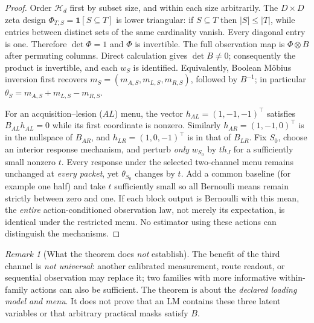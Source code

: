 \documentclass[11pt,a4paper]{article}
\newcommand{\Hh}{\mathcal{H}}\newcommand{\V}{\mathcal{V}}
\newcommand{\ind}{\mathbf{1}}\newcommand{\supp}{\mathrm{supp}}
\theoremstyle{definition}\newtheorem{definition}[theorem]{Definition}
\theoremstyle{remark}\newtheorem{remark}[theorem]{Remark}
\begin{document}
\begin{proof}
Order $\Hh_d$ first by subset size, and within each size arbitrarily. The $D\times D$ zeta design $\Phi_{T,S}=\ind[S\subseteq T]$ is lower triangular: if $S\subseteq T$ then $|S|\le |T|$, while entries between distinct sets of the same cardinality vanish. Every diagonal entry is one. Therefore $\det\Phi=1$ and $\Phi$ is invertible. The full observation map is $\Phi\otimes B$ after permuting columns. Direct calculation gives $\det B\ne 0$; consequently the product is invertible, and each $w_S$ is identified. Equivalently, Boolean M\"obius inversion first recovers $m_S=(m_{A,S},m_{L,S},m_{R,S})$, followed by $B^{-1}$; in particular $\theta_S=m_{A,S}+m_{L,S}-m_{R,S}$.

For an acquisition--lesion ($AL$) menu, the vector $h_{AL}=(1,-1,-1)^\top$ satisfies $B_{AL}h_{AL}=0$ while its first coordinate is nonzero. Similarly $h_{AR}=(1,-1,0)^\top$ is in the nullspace of $B_{AR}$, and $h_{LR}=(1,0,-1)^\top$ is in that of $B_{LR}$. Fix $S_0$, choose an interior response mechanism, and perturb \emph{only} $w_{S_0}$ by $th_J$ for a sufficiently small nonzero $t$. Every response under the selected two-channel menu remains unchanged at \emph{every packet}, yet $\theta_{S_0}$ changes by $t$. Add a common baseline (for example one half) and take $t$ sufficiently small so all Bernoulli means remain strictly between zero and one. If each block output is Bernoulli with this mean, the \emph{entire} action-conditioned observation law, not merely its expectation, is identical under the restricted menu. No estimator using these actions can distinguish the mechanisms.\qedhere
\end{proof}
\begin{remark}[What the theorem does \emph{not} establish]
The benefit of the third channel is \emph{not universal}: another calibrated measurement, route readout, or sequential observation may replace it; two families with more informative within-family actions can also be sufficient. The theorem is about the \emph{declared loading model and menu}. It does not prove that an LM contains these three latent variables or that arbitrary practical masks satisfy $B$.
\end{remark}
\end{document}
